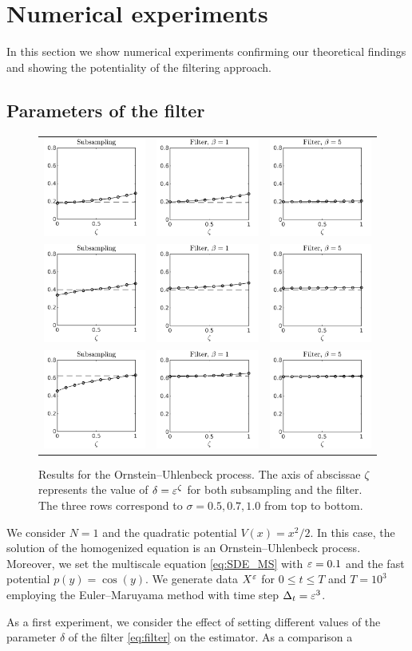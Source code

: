\documentclass[10pt]{article}
\begin{document}
\section{Numerical experiments}\label{sec:NumExp}

In this section we show numerical experiments confirming our theoretical findings and showing the potentiality of the filtering approach.

\subsection{Parameters of the filter}\label{sec:Num_Param}
\begin{figure}[t]
	\centering
	\begin{tabular}{ccc}
		\includegraphics[]{Figures/OUSubs_s5} & \includegraphics[]{Figures/OUFilt_s5_b1}  & \includegraphics[]{Figures/OUFilt_s5_b5} \\ %
		\includegraphics[]{Figures/OUSubs_s7} & \includegraphics[]{Figures/OUFilt_s7_b1}  & \includegraphics[]{Figures/OUFilt_s7_b5} \\ %
		\includegraphics[]{Figures/OUSubs_s10} & \includegraphics[]{Figures/OUFilt_s10_b1}  & \includegraphics[]{Figures/OUFilt_s10_b5} %
	\end{tabular}
	\caption{Results for the Ornstein--Uhlenbeck process. The axis of abscissae $\zeta$ represents the value of $\delta = \varepsilon^\zeta$ for both subsampling and the filter. The three rows correspond to $\sigma = 0.5, 0.7, 1.0$ from top to bottom.}
	\label{fig:OU}
\end{figure}
We consider $N = 1$ and the quadratic potential $V(x) = x^2/2$. In this case, the solution of the homogenized equation is an Ornstein--Uhlenbeck process. Moreover, we set the multiscale equation \eqref{eq:SDE_MS} with $\varepsilon = 0.1$ and the fast potential $p(y) = \cos(y)$. We generate data $X^\varepsilon$ for $0 \leq t \leq T$ and $T = 10^3$ employing the Euler--Maruyama method with time step $\Delta_t = \varepsilon^3$. 

As a first experiment, we consider the effect of setting different values of the parameter $\delta$ of the filter \eqref{eq:filter} on the estimator. As a comparison a
\end{document}
